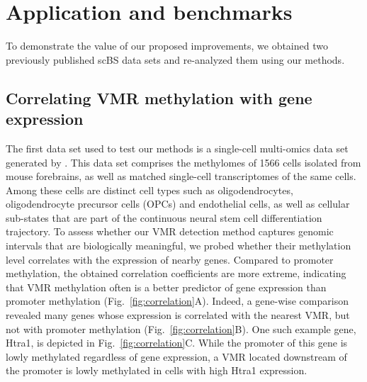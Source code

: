 \documentclass[twocolumn,10pt]{article}
\begin{document}
\section{Application and benchmarks}

To demonstrate the value of our proposed improvements, we obtained two previously published scBS data sets and re-analyzed them using our methods.

\subsection{Correlating VMR methylation with gene expression}

The first data set used to test our methods is a single-cell multi-omics data set generated by \citet{kremer_scnmt}.
This data set comprises the methylomes of 1566 cells isolated from mouse forebrains, as well as matched single-cell transcriptomes of the same cells.
Among these cells are distinct cell types such as oligodendrocytes, oligodendrocyte precursor cells (OPCs) and endothelial cells, as well as cellular sub-states that are part of the continuous neural stem cell differentiation trajectory.
To assess whether our VMR detection method captures genomic intervals that are biologically meaningful, we probed whether their methylation level correlates with the expression of nearby genes.
Compared to promoter methylation, the obtained correlation coefficients are more extreme, indicating that VMR methylation often is a better predictor of gene expression than promoter methylation (Fig.~\ref{fig:correlation}A).
Indeed, a gene-wise comparison revealed many genes whose expression is correlated with the nearest VMR, but not with promoter methylation (Fig.~\ref{fig:correlation}B).
One such example gene, Htra1, is depicted in Fig.~\ref{fig:correlation}C.
While the promoter of this gene is lowly methylated regardless of gene expression, a VMR located downstream of the promoter is lowly methylated in cells with high Htra1 expression.
\end{document}
